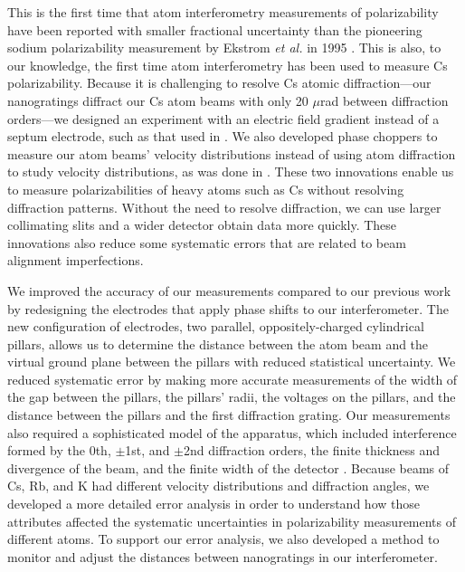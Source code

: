 \documentclass[twocolumn,pra,showpacs,superscriptaddress,longbibliography]{revtex4-1}   %
\newcommand{\etalspace}{\textit{et al. }}
\begin{document}
This is the first time that atom interferometry measurements of polarizability have been reported with smaller fractional uncertainty than the pioneering sodium polarizability measurement by Ekstrom \etalspace in 1995 \cite{Ekstrom1995}.
This is also, to our knowledge, the first time atom interferometry has been used to measure Cs polarizability.
Because it is challenging to resolve Cs atomic diffraction---our nanogratings diffract our Cs atom beams with only 20 $\mu$rad between diffraction orders---we designed an experiment 
with an electric field gradient instead of a septum electrode, such as that used in \cite{Ekstrom1995,Miffre2006}.
We also developed phase choppers \cite{Roberts2002,Roberts2004,Holmgren2011,Hromada2014} to measure our atom beams' velocity distributions instead of 
using atom diffraction to study velocity distributions, as was done in \cite{Ekstrom1995,Holmgren2010}.
These two innovations enable us to measure polarizabilities of heavy atoms such as Cs without resolving diffraction patterns. 
Without the need to resolve diffraction, we can use larger collimating slits and a wider detector obtain data more quickly. These innovations also reduce some systematic errors that are related to beam alignment imperfections.

We improved the accuracy of our measurements compared to our previous work \cite{Holmgren2010} by redesigning the electrodes that apply phase shifts to our interferometer. 
The new configuration of electrodes, two parallel, oppositely-charged cylindrical pillars, allows us to determine the distance between the atom beam and the virtual ground plane between the pillars with reduced statistical uncertainty. We reduced systematic error by making more accurate measurements of the width of the gap between the pillars, the pillars' radii, the voltages on the pillars, and the distance between the pillars and the first diffraction grating.
Our measurements also required a sophisticated model of the apparatus, which included
interference formed by the 0th, $\pm$1st, and $\pm$2nd diffraction orders, the finite thickness and divergence of the beam, and the finite width of the detector \cite{Hromada2014}.
Because beams of Cs, Rb, and K had different velocity distributions and diffraction angles, we developed a more detailed error analysis in order to understand how those attributes affected the systematic uncertainties in polarizability measurements of different atoms.
To support our error analysis, we also developed a method to monitor and adjust the distances between nanogratings in our interferometer.
\end{document}

